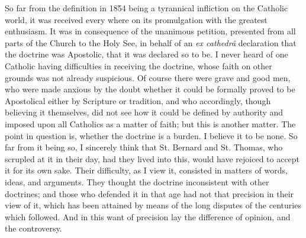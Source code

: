 So far from the definition in 1854 being a tyrannical infliction on
the Catholic world, it was received every where on its promulgation with
the greatest enthusiasm. It was in consequence of the unanimous
petition, presented from all parts of the Church to the Holy
See, in behalf of an \emph{ex cathedrâ} declaration
that the doctrine was Apostolic, that it was declared so to be. I never
heard of one Catholic having difficulties in receiving the doctrine,
whose faith on other grounds was not already suspicious. Of
course there were grave and good men, who were made anxious by the doubt
whether it could be formally proved to be Apostolical
either by Scripture or tradition, and who accordingly, though believing
it themselves, did not see how it could be defined by authority and imposed upon all Catholics as a matter of faith; but this is
another matter. The point in question is, whether the doctrine is a
burden. I believe it to be none. So far from it being so, I sincerely
think that St. Bernard and St. Thomas, who scrupled at it in their day,
had they lived into this, would have rejoiced to accept it for its own
sake. Their difficulty, as I view it, consisted in matters of words,
ideas, and arguments. They thought the doctrine inconsistent with other
doctrines; and those who defended it in that age had not that precision
in their view of it, which has been attained by means of
the long disputes of the centuries which followed. And in this want of
precision lay the difference of opinion, and the controversy.

